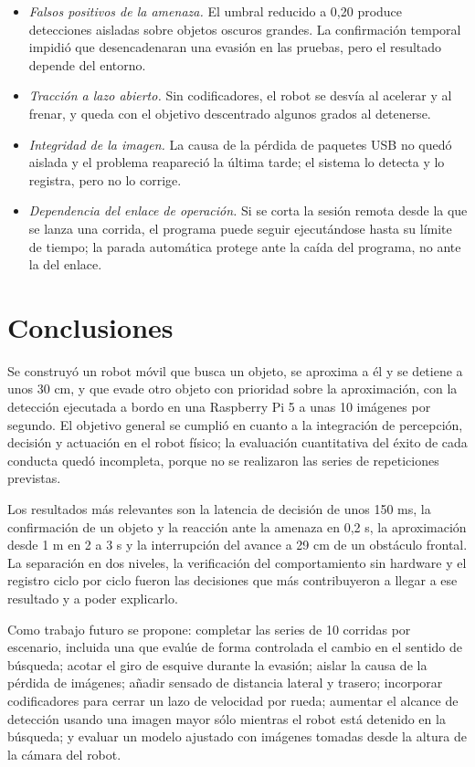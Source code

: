 \documentclass[pdflatex,sn-mathphys-num]{sn-jnl}
\begin{document}
\begin{itemize}
  \item \emph{Falsos positivos de la amenaza.} El umbral reducido a 0,20
        produce detecciones aisladas sobre objetos oscuros grandes. La
        confirmaci\'on temporal impidi\'o que desencadenaran una evasi\'on en
        las pruebas, pero el resultado depende del entorno.
  \item \emph{Tracci\'on a lazo abierto.} Sin codificadores, el robot se
        desv\'ia al acelerar y al frenar, y queda con el objetivo descentrado
        algunos grados al detenerse.
  \item \emph{Integridad de la imagen.} La causa de la p\'erdida de paquetes
        USB no qued\'o aislada y el problema reapareci\'o la \'ultima tarde;
        el sistema lo detecta y lo registra, pero no lo corrige.
  \item \emph{Dependencia del enlace de operaci\'on.} Si se corta la sesi\'on
        remota desde la que se lanza una corrida, el programa puede seguir
        ejecut\'andose hasta su l\'imite de tiempo; la parada autom\'atica
        protege ante la ca\'ida del programa, no ante la del enlace.
\end{itemize}

\section{Conclusiones}\label{sec:conclusiones}

Se construy\'o un robot m\'ovil que busca un objeto, se aproxima a \'el y se
detiene a unos 30 cm, y que evade otro objeto con prioridad sobre la
aproximaci\'on, con la detecci\'on ejecutada a bordo en una Raspberry Pi 5 a
unas 10 im\'agenes por segundo. El objetivo general se cumpli\'o en cuanto
a la integraci\'on de percepci\'on, decisi\'on y actuaci\'on en el robot
f\'isico; la evaluaci\'on cuantitativa del \'exito de cada conducta qued\'o
incompleta, porque no se realizaron las series de repeticiones previstas.

Los resultados m\'as relevantes son la latencia de decisi\'on de unos 150 ms,
la confirmaci\'on de un objeto y la reacci\'on ante la amenaza en 0,2 s, la
aproximaci\'on desde 1 m en 2 a 3 s y la interrupci\'on del avance a 29 cm de
un obst\'aculo frontal. La separaci\'on en dos niveles, la verificaci\'on del
comportamiento sin hardware y el registro ciclo por ciclo fueron las
decisiones que m\'as contribuyeron a llegar a ese resultado y a poder
explicarlo.

Como trabajo futuro se propone: completar las series de 10 corridas por
escenario, incluida una que eval\'ue de forma controlada el cambio en el
sentido de b\'usqueda; acotar el giro de esquive durante la evasi\'on; aislar
la causa de la p\'erdida de im\'agenes; a\~nadir sensado de distancia lateral
y trasero; incorporar codificadores para cerrar un lazo de velocidad
por rueda; aumentar el alcance de detecci\'on usando una imagen mayor s\'olo
mientras el robot est\'a detenido en la b\'usqueda; y evaluar un modelo
ajustado con im\'agenes tomadas desde la altura de la c\'amara del robot.
\end{document}
